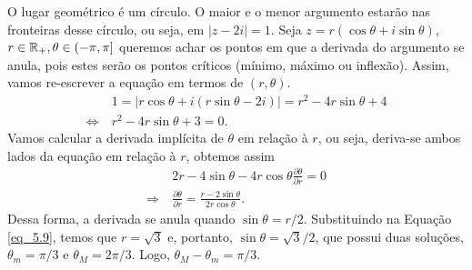 \begin{questions}
\setcounter{question}{8}
\begin{solution}
    O lugar geométrico é um círculo. O maior e o menor argumento estarão nas fronteiras desse círculo, ou seja, em $|z-2i|=1$. Seja $z = r(\cos\theta+i\sin\theta)$, $r\in{\mathbb R}_+, \theta\in(-\pi,\pi]$ queremos achar os pontos em que a derivada do argumento se anula, pois estes serão os pontos críticos (mínimo, máximo ou inflexão). Assim, vamos re-escrever a equação em termos de $(r,\theta)$.
    \begin{align}
        & 1 = |r\cos\theta+i(r\sin\theta-2i)| = r^2 - 4r\sin\theta +4 \nonumber\\
        \Leftrightarrow~ & r^2 - 4r\sin\theta + 3 = 0. \label{eq_5.9}
    \end{align}
    Vamos calcular a derivada implícita de $\theta$ em relação à $r$, ou seja, deriva-se ambos lados da equação em relação à $r$, obtemos assim
    \begin{align*}
        & 2r - 4\sin\theta - 4r\cos\theta \frac{\partial \theta}{\partial r} = 0 \\
        \Rightarrow~& \frac{\partial \theta}{\partial r} = \frac{r - 2\sin\theta}{2 r \cos\theta}.
    \end{align*}
    Dessa forma, a derivada se anula quando $\sin\theta = r/2$. Substituindo na Equação \eqref{eq_5.9}, temos que $r = \sqrt{3}$ e, portanto, $\sin\theta = \sqrt{3}/2$, que possui duas soluções, $\theta_m = \pi/3$ e $\theta_M = 2\pi/3$. Logo, $\theta_M - \theta_m = \pi/3$.
    
    
    
\end{solution}

\end{questions}
